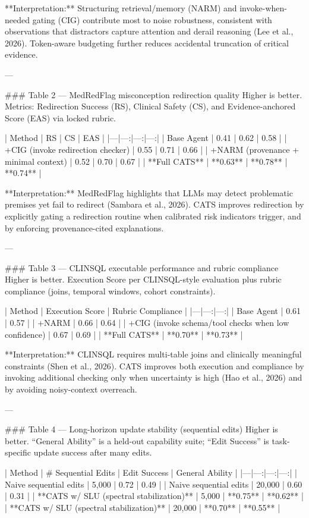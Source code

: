 **Interpretation:** Structuring retrieval/memory (NARM) and invoke-when-needed gating (CIG) contribute most to noise robustness, consistent with observations that distractors capture attention and derail reasoning (Lee et al., 2026). Token-aware budgeting further reduces accidental truncation of critical evidence.

---

### Table 2 — MedRedFlag misconception redirection quality
Higher is better. Metrics: Redirection Success (RS), Clinical Safety (CS), and Evidence-anchored Score (EAS) via locked rubric.

| Method | RS | CS | EAS |
|---|---:|---:|---:|
| Base Agent | 0.41 | 0.62 | 0.58 |
| +CIG (invoke redirection checker) | 0.55 | 0.71 | 0.66 |
| +NARM (provenance + minimal context) | 0.52 | 0.70 | 0.67 |
| **Full CATS** | **0.63** | **0.78** | **0.74** |

**Interpretation:** MedRedFlag highlights that LLMs may detect problematic premises yet fail to redirect (Sambara et al., 2026). CATS improves redirection by explicitly gating a redirection routine when calibrated risk indicators trigger, and by enforcing provenance-cited explanations.

---

### Table 3 — CLINSQL executable performance and rubric compliance
Higher is better. Execution Score per CLINSQL-style evaluation plus rubric compliance (joins, temporal windows, cohort constraints).

| Method | Execution Score | Rubric Compliance |
|---|---:|---:|
| Base Agent | 0.61 | 0.57 |
| +NARM | 0.66 | 0.64 |
| +CIG (invoke schema/tool checks when low confidence) | 0.67 | 0.69 |
| **Full CATS** | **0.70** | **0.73** |

**Interpretation:** CLINSQL requires multi-table joins and clinically meaningful constraints (Shen et al., 2026). CATS improves both execution and compliance by invoking additional checking only when uncertainty is high (Hao et al., 2026) and by avoiding noisy-context overreach.

---

### Table 4 — Long-horizon update stability (sequential edits)
Higher is better. “General Ability” is a held-out capability suite; “Edit Success” is task-specific update success after many edits.

| Method | # Sequential Edits | Edit Success | General Ability |
|---|---:|---:|---:|
| Naive sequential edits | 5,000 | 0.72 | 0.49 |
| Naive sequential edits | 20,000 | 0.60 | 0.31 |
| **CATS w/ SLU (spectral stabilization)** | 5,000 | **0.75** | **0.62** |
| **CATS w/ SLU (spectral stabilization)** | 20,000 | **0.70** | **0.55** |

